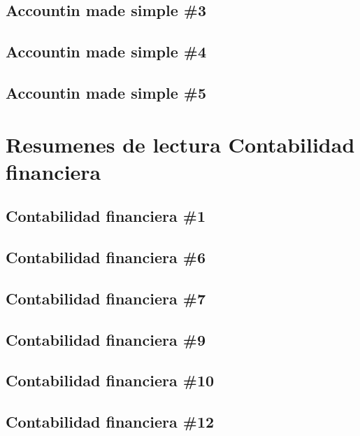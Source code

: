 \documentclass{book}
\begin{document}
\chapter{ Accountin made simple \#3}


\chapter{ Accountin made simple \#4}


\chapter{ Accountin made simple \#5}



\part{Resumenes de lectura Contabilidad financiera}
\chapter{ Contabilidad financiera \#1}


\chapter{ Contabilidad financiera \#6}


\chapter{ Contabilidad financiera \#7}


\chapter{ Contabilidad financiera \#9}


\chapter{ Contabilidad financiera \#10}


\chapter{ Contabilidad financiera \#12}

\end{document}
